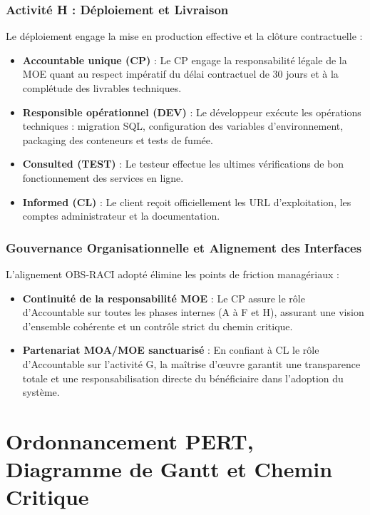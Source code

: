 \documentclass[a4paper,12pt]{report}
\begin{document}
	\subsection{Activité H : Déploiement et Livraison}
	Le déploiement engage la mise en production effective et la clôture contractuelle :
	\begin{itemize}[leftmargin=1.0cm, noitemsep, topsep=1pt]
		\item \textbf{Accountable unique (CP)} : Le CP engage la responsabilité légale de la MOE quant au respect impératif du délai contractuel de 30 jours et à la complétude des livrables techniques.
		\item \textbf{Responsible opérationnel (DEV)} : Le développeur exécute les opérations techniques : migration SQL, configuration des variables d'environnement, packaging des conteneurs et tests de fumée.
		\item \textbf{Consulted (TEST)} : Le testeur effectue les ultimes vérifications de bon fonctionnement des services en ligne.
		\item \textbf{Informed (CL)} : Le client reçoit officiellement les URL d'exploitation, les comptes administrateur et la documentation.
	\end{itemize}
	
	\subsection{Gouvernance Organisationnelle et Alignement des Interfaces}
	L'alignement OBS-RACI adopté élimine les points de friction managériaux :
	\begin{itemize}[leftmargin=1.0cm, noitemsep, topsep=1pt]
		\item \textbf{Continuité de la responsabilité MOE} : Le CP assure le rôle d'Accountable sur toutes les phases internes (A à F et H), assurant une vision d'ensemble cohérente et un contrôle strict du chemin critique.
		\item \textbf{Partenariat MOA/MOE sanctuarisé} : En confiant à CL le rôle d'Accountable sur l'activité G, la maîtrise d'œuvre garantit une transparence totale et une responsabilisation directe du bénéficiaire dans l'adoption du système.
	\end{itemize}

	\chapter{Ordonnancement PERT, Diagramme de Gantt et Chemin Critique}
	
\end{document}
